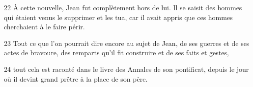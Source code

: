 
22 À cette nouvelle, Jean fut complètement hors de lui. Il se saisit des hommes qui étaient venus le supprimer et les tua, car il avait appris que ces hommes cherchaient à le faire périr.

23 Tout ce que l’on pourrait dire encore au sujet de Jean, de ses guerres et de ses actes de bravoure, des remparts qu’il fit construire et de ses faits et gestes,

24 tout cela est raconté dans le livre des Annales de son pontificat, depuis le jour où il devint grand prêtre à la place de son père.
